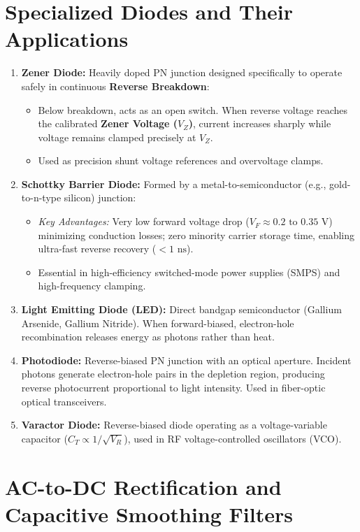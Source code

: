 \section{Specialized Diodes and Their Applications}
\label{sec:specialized_diodes}

\begin{enumerate}[label=\bfseries\arabic*.]
    \item \textbf{Zener Diode:} Heavily doped PN junction designed specifically to operate safely in continuous \textbf{Reverse Breakdown}:
    \begin{itemize}
        \item Below breakdown, acts as an open switch. When reverse voltage reaches the calibrated \textbf{Zener Voltage ($V_Z$)}, current increases sharply while voltage remains clamped precisely at $V_Z$.
        \item Used as precision shunt voltage references and overvoltage clamps.
    \end{itemize}
    \item \textbf{Schottky Barrier Diode:} Formed by a metal-to-semiconductor (e.g., gold-to-n-type silicon) junction:
    \begin{itemize}
        \item \textit{Key Advantages:} Very low forward voltage drop ($V_F \approx 0.2\text{ to } 0.35\text{ V}$) minimizing conduction losses; zero minority carrier storage time, enabling ultra-fast reverse recovery ($<1\text{ ns}$).
        \item Essential in high-efficiency switched-mode power supplies (SMPS) and high-frequency clamping.
    \end{itemize}
    \item \textbf{Light Emitting Diode (LED):} Direct bandgap semiconductor (Gallium Arsenide, Gallium Nitride). When forward-biased, electron-hole recombination releases energy as photons rather than heat.
    \item \textbf{Photodiode:} Reverse-biased PN junction with an optical aperture. Incident photons generate electron-hole pairs in the depletion region, producing reverse photocurrent proportional to light intensity. Used in fiber-optic optical transceivers.
    \item \textbf{Varactor Diode:} Reverse-biased diode operating as a voltage-variable capacitor ($C_T \propto 1/\sqrt{V_R}$), used in RF voltage-controlled oscillators (VCO).
\end{enumerate}


\section{AC-to-DC Rectification and Capacitive Smoothing Filters}
\label{sec:rectifiers}

